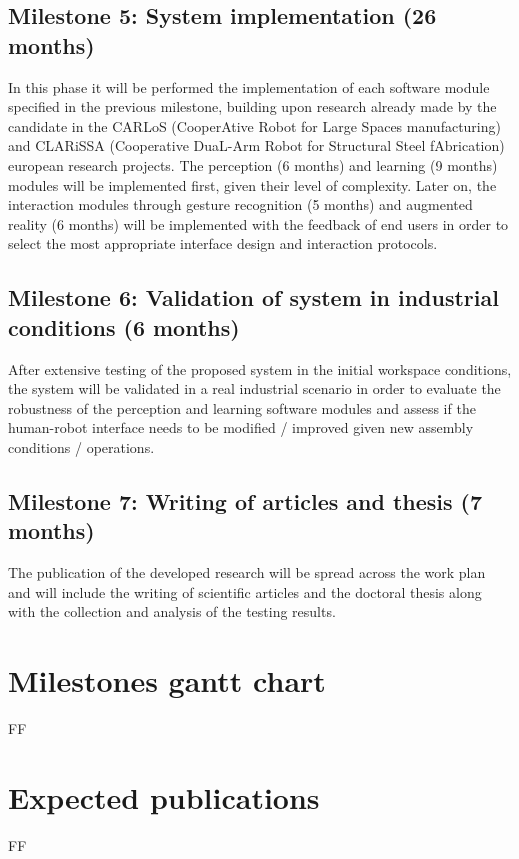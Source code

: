 \subsection{Milestone 5: System implementation (26 months)}

In this phase it will be performed the implementation of each software module specified in the previous milestone, building upon research already made by the candidate in the CARLoS (CooperAtive Robot for Large Spaces manufacturing) and CLARiSSA (Cooperative DuaL-Arm Robot for Structural Steel fAbrication) european research projects. The perception (6 months) and learning (9 months) modules will be implemented first, given their level of complexity. Later on, the interaction modules through gesture recognition (5 months) and augmented reality (6 months) will be implemented with the feedback of end users in order to select the most appropriate interface design and interaction protocols.


\subsection{Milestone 6: Validation of system in industrial conditions (6 months)}

After extensive testing of the proposed system in the initial workspace conditions, the system will be validated in a real industrial scenario in order to evaluate the robustness of the perception and learning software modules and assess if the human-robot interface needs to be modified / improved given new assembly conditions / operations.


\subsection{Milestone 7: Writing of articles and thesis (7 months)}

The publication of the developed research will be spread across the work plan and will include the writing of scientific articles and the doctoral thesis along with the collection and analysis of the testing results.


\section{Milestones gantt chart}

FF


\section{Expected publications}

FF

